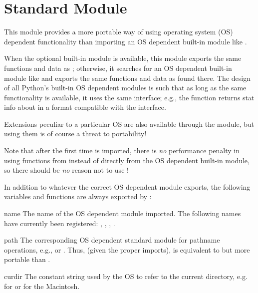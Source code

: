 \section{Standard Module }
\label{module-os}

This module provides a more portable way of using operating system
(OS) dependent functionality than importing an OS dependent built-in
module like .

When the optional built-in module  is available, this
module exports the same functions and data as ; otherwise,
it searches for an OS dependent built-in module like  and
exports the same functions and data as found there.  The design of all
Python's built-in OS dependent modules is such that as long as the same
functionality is available, it uses the same interface; e.g., the
function  returns stat info about 
in a format compatible with the \POSIX{} interface.

Extensions peculiar to a particular OS are also available through the
 module, but using them is of course a threat to
portability!

Note that after the first time  is imported, there is
\emph{no} performance penalty in using functions from 
instead of directly from the OS dependent built-in module, so there
should be \emph{no} reason not to use !

In addition to whatever the correct OS dependent module exports, the
following variables and functions are always exported by :

\begin{datadesc}{name}
The name of the OS dependent module imported.  The following names
have currently been registered: , ,
, .
\end{datadesc}

\begin{datadesc}{path}
The corresponding OS dependent standard module for pathname
operations, e.g.,  or .  Thus, (given
the proper imports),  is equivalent to but
more portable than .
\end{datadesc}

\begin{datadesc}{curdir}
The constant string used by the OS to refer to the current directory,
e.g.  for \POSIX{} or  for the Macintosh.
\end{datadesc}

